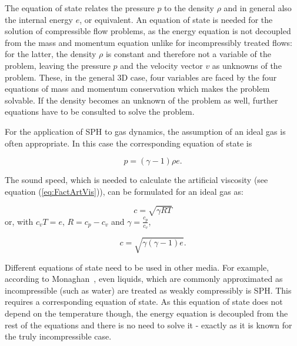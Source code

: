 \documentclass{report}
\begin{document}
The equation of state relates the pressure $p$ 
to the density $\rho$ and in general also the internal energy $e$, or equivalent.
An equation of state is needed for the solution of compressible flow problems, as the energy equation is not decoupled from the mass and momentum equation unlike for incompressibly treated flows: for the latter, the density $\rho$ is constant and therefore not a variable of the problem, leaving the pressure $p$ and the velocity vector $v$ as unknowns of the problem. These, in the general 3D case, four variables are faced by the four equations of mass and momentum conservation which makes the problem solvable. If the density becomes an unknown of the problem as well, further equations have to be consulted to solve the problem.
 
For the application of SPH to gas dynamics, the assumption of an ideal gas is often
appropriate.
In this case the corresponding equation of state is



\begin{equation}
\label{eq:idealGasEqState}
 p=(\gamma-1)\rho e.
\end{equation}

The sound speed, which is needed to calculate the artificial viscosity (see equation (\ref{eq:FactArtVis})), can be formulated for an ideal gas as:

\begin{equation}
\label{eq:soundSpeed}
 c=\sqrt{\gamma R T}
\end{equation}
or, with $c_v T=e$, $R=c_p-c_v$ and $\gamma=\frac{c_p}{c_v}$,

\begin{equation}
 c=\sqrt{\gamma(\gamma-1)e}.
\end{equation}

Different equations of state need to be used in other media. For example, according to Monaghan~\cite{Monaghan1994,Monaghan2005}, even liquids, which are commonly approximated
as incompressible (such as water) are treated as weakly compressibly is SPH. This requires a corresponding equation of state. As this equation of state does not depend on the temperature though, the energy equation is decoupled from the rest of the equations and there is no need to solve it - exactly as it is known for the truly incompressible case.
\end{document}
